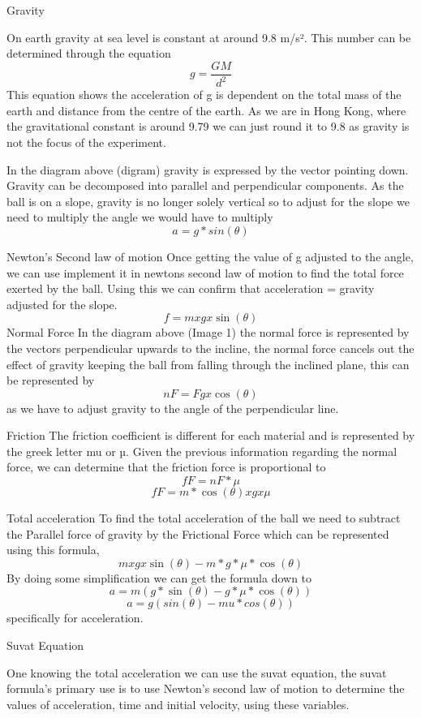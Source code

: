 \documentclass[12pt]{report}
\begin{document}
Gravity

On earth gravity at sea level is constant at around 9.8 m/s². This number can be determined through the equation
\[g = \frac{GM}{d^2}\]
This equation shows the acceleration of g is dependent on the total mass of the earth and distance from the centre of the earth.  As we are in Hong Kong, where the gravitational constant is around 9.79 we can just round it to 9.8 as gravity is not the focus of the experiment.

In the diagram above (digram) gravity is expressed by the vector pointing down. Gravity can be decomposed into parallel and perpendicular components. As the ball is on a slope, gravity is no longer solely vertical  so to adjust for the slope we need to multiply the angle we would have to multiply
\[a = g*sin(\theta)\]


Newton's Second law of motion
Once getting the value of g adjusted to the angle, we can use implement it in newtons second law of motion to find the total force exerted by the ball.
Using this we can confirm that acceleration = gravity adjusted for the slope.
\[f = m x g x \sin(\theta)\]
Normal Force
In the diagram above (Image 1) the normal force is represented by the vectors perpendicular upwards to the incline, the normal force cancels out the effect of gravity keeping the ball from falling through the inclined plane, this can be represented by
\[nF = Fg x \cos(\theta)\]
as we have to adjust gravity to the angle of the perpendicular line.

Friction
The friction coefficient is different for each material and is represented by the greek letter mu or µ.
Given the previous information regarding the normal force, we can determine that the friction force is proportional to
\[fF = nF * \mu\]
\therefore
\[fF = m * \cos(\theta) x g x \mu\]

Total acceleration
To find the total acceleration of the ball we need to subtract the Parallel force of gravity by the  Frictional Force which can be represented using this formula,
\[m x g x \sin(\theta)- m *g*\mu*\cos(\theta)\]
By doing some simplification we can get the formula down to
\[a = m(g*\sin(\theta) - g*\mu*\cos(\theta))\]
\therefore
\[a = g(sin(θ) - mu*cos(θ))\] specifically for acceleration.


Suvat Equation

One knowing the total acceleration we can use the suvat equation, the suvat formula’s primary use is to use Newton's second law of motion to determine the values of acceleration, time and initial velocity, using these variables.
\end{document}
